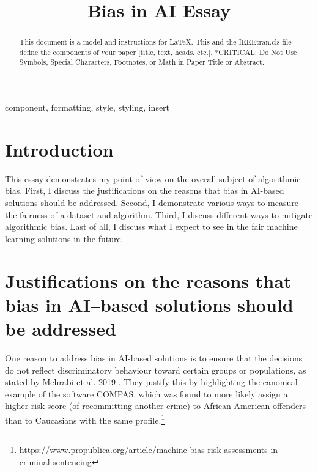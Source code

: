 \documentclass[conference]{IEEEtran}
\begin{document}
\title{Bias in AI Essay
}

\author{
}

\maketitle

\begin{abstract}
This document is a model and instructions for \LaTeX.
This and the IEEEtran.cls file define the components of your paper [title, text, heads, etc.]. *CRITICAL: Do Not Use Symbols, Special Characters, Footnotes, 
or Math in Paper Title or Abstract.
\end{abstract}

\begin{IEEEkeywords}
component, formatting, style, styling, insert
\end{IEEEkeywords}

\section{Introduction}
This essay demonstrates my point of view on the overall subject of algorithmic bias. First, I discuss the justifications on the reasons that bias in AI-based solutions should be addressed. Second, I demonstrate various ways to measure the fairness of a dataset and algorithm. Third, I discuss different ways to mitigate algorithmic bias. Last of all, I discuss what I expect to see in the fair machine learning solutions in the future.

\section{Justifications on the reasons that bias in AI–based solutions should be addressed}
One reason to address bias in AI-based solutions is to ensure that the decisions do not reflect discriminatory behaviour toward certain groups or populations, as stated by Mehrabi et al. 2019 \cite{DBLP:journals/corr/abs-1908-09635}. They justify this by highlighting the canonical example of the software COMPAS, which was found to more likely assign a higher risk score (of recommitting another crime) to African-American offenders than to Caucasians with the same profile.\footnote{https://www.propublica.org/article/machine-bias-risk-assessments-in-criminal-sentencing} 
\end{document}

